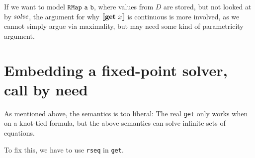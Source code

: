 \documentclass[manuscript,screen,acmsmall,nonacm]{acmart}
\begin{document}
If we want to model $\texttt{RMap a b}$, where values from $D$ are stored, but not looked at by $\operatorname{\textit{solve}}$, the argument for why $\llbracket \mathbf{get}~x \rrbracket$ is continuous is more involved, as we cannot simply argue via maximality, but may need some kind of parametricity argument.

\section{Embedding a fixed-point solver, call by need}

As mentioned above, the semantics is too liberal: The real \texttt{get} only works when on a knot-tied formula, but the above semantics can solve infinite sets of equations.

To fix this, we have to use \texttt{rseq} in \texttt{get}.
\end{document}
